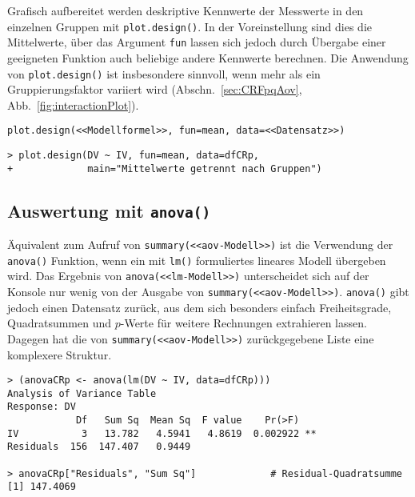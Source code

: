 Grafisch aufbereitet werden deskriptive Kennwerte der Messwerte in den einzelnen Gruppen mit \lstinline!plot.design()!. In der Voreinstellung sind dies die Mittelwerte, über das Argument \lstinline!fun! lassen sich jedoch durch Übergabe einer geeigneten Funktion auch beliebige andere Kennwerte berechnen. Die Anwendung von \lstinline!plot.design()! ist insbesondere sinnvoll, wenn mehr als ein Gruppierungsfaktor variiert wird (Abschn.\ \ref{sec:CRFpqAov}, Abb.\ \ref{fig:interactionPlot}).
\begin{lstlisting}
plot.design(<<Modellformel>>, fun=mean, data=<<Datensatz>>)
\end{lstlisting}

\begin{lstlisting}
> plot.design(DV ~ IV, fun=mean, data=dfCRp,
+             main="Mittelwerte getrennt nach Gruppen")
\end{lstlisting}

\subsection{Auswertung mit \texttt{anova()}}
\label{sec:anova}

Äquivalent zum Aufruf von \lstinline!summary(<<aov-Modell>>)! ist die Verwendung der \lstinline!anova()! Funktion, wenn ein mit \lstinline!lm()! formuliertes lineares Modell übergeben wird. Das Ergebnis von \lstinline!anova(<<lm-Modell>>)! unterscheidet sich auf der Konsole nur wenig von der Ausgabe von \lstinline!summary(<<aov-Modell>>)!. \lstinline!anova()! gibt jedoch einen Datensatz zurück, aus dem sich besonders einfach Freiheitsgrade, Quadratsummen und $p$-Werte für weitere Rechnungen extrahieren lassen. Dagegen hat die von \lstinline!summary(<<aov-Modell>>)! zurückgegebene Liste eine komplexere Struktur.
\begin{lstlisting}
> (anovaCRp <- anova(lm(DV ~ IV, data=dfCRp)))
Analysis of Variance Table
Response: DV
            Df   Sum Sq  Mean Sq  F value    Pr(>F)
IV           3   13.782   4.5941   4.8619  0.002922 **
Residuals  156  147.407   0.9449

> anovaCRp["Residuals", "Sum Sq"]             # Residual-Quadratsumme
[1] 147.4069
\end{lstlisting}

